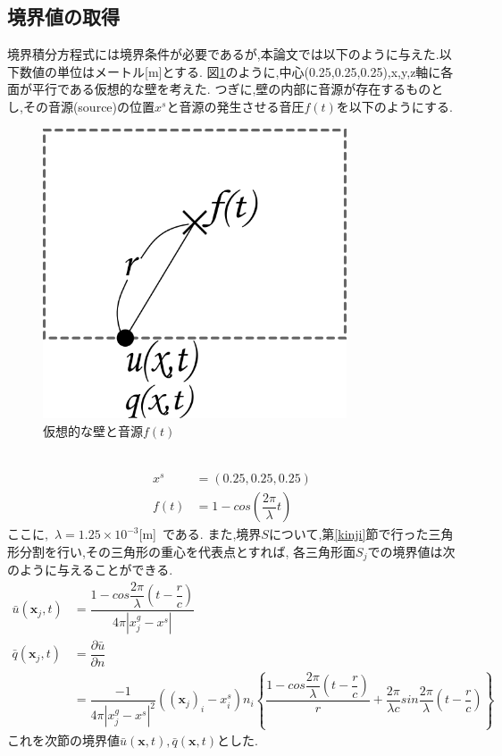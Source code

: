 \documentclass[dvipdfmx]{ampbt}
\begin{document}
\subsection{境界値の取得}
\label{境界値の取得}
境界積分方程式には境界条件が必要であるが,本論文では以下のように与えた.以下数値の単位はメートル[m]とする.
図\ref{fig:get_kyoukai}のように,中心(0.25,0.25,0.25),x,y,z軸に各面が平行である仮想的な壁を考えた.
つぎに,壁の内部に音源が存在するものとし,その音源(source)の位置$x^s$と音源の発生させる音圧$f(t)$を以下のようにする.
\begin{figure}[H]
  \begin{center}
    \includegraphics[clip,width=9.0cm]{./png/get_kyoukai.png}
    \caption{仮想的な壁と音源$f(t)$}
    \label{fig:get_kyoukai}
  \end{center}
\end{figure}\\

\begin{align}
x^s &= (0.25,0.25,0.25)\\
\label{ef:f(t)}
f(t) &= 1-cos(\dfrac{2 \pi}{\lambda}t)
\end{align}
ここに,\ $\lambda = 1.25 \times 10^{-3}$[m]\ である.
また,境界$S$について,第\ref{kinji}節で行った三角形分割を行い,その三角形の重心を代表点とすれば,
各三角形面$S_j$での境界値は次のように与えることができる.
\begin{align}
\bar{u}(\bm{x}_j,t) &= \dfrac{1-cos\dfrac{2 \pi}{\lambda}(t-\dfrac{r}{c})}{4\pi|x^g_j-x^s|} \\
\bar{q}(\bm{x}_j,t) &= \dfrac{\partial \bar{u}}{\partial n} \nonumber \\
               &= \dfrac{-1}{4\pi|x^g_j-x^s|^2}((\bm{x}_j)_i-x^s_i)n_i \left\{ \dfrac{1-cos\dfrac{2 \pi}{\lambda}(t-\dfrac{r}{c})}{r} + \dfrac{2\pi}{\lambda c} sin\dfrac{2\pi}{\lambda}(t-\dfrac{r}{c})  \right\}
\end{align}
これを次節の境界値$\bar{u}(\bm{x},t),\bar{q}(\bm{x},t)$とした.
\end{document}
